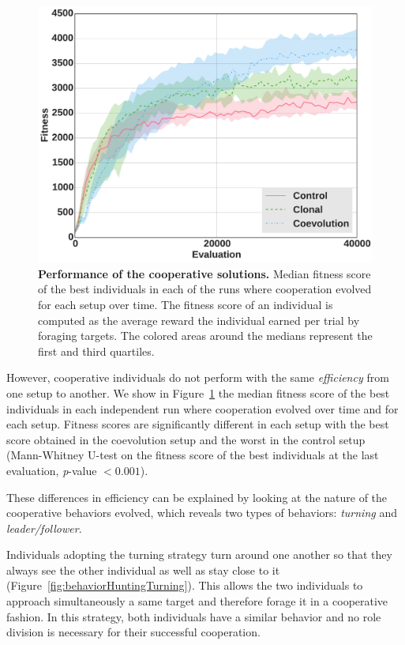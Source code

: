     \begin{figure}[h]
      \begin{center}
        \includegraphics[scale = 0.40]{fig/ArticleRob1/fitnessHuntingStags.pdf}
        \caption{\textbf{Performance of the cooperative solutions.}
        Median fitness score of the best individuals in each of the runs where cooperation evolved for each setup over time. The fitness score of an individual is computed as the average reward the individual earned per trial by foraging targets. The colored areas around the medians represent the first and third quartiles.} 
        \label{fig:HuntingFitness}
      \end{center}
    \end{figure}

    However, cooperative individuals do not perform with the same \emph{efficiency} from one setup to another. We show in Figure~\ref{fig:HuntingFitness} the median fitness score of the best individuals in each independent run where cooperation evolved over time and for each setup. Fitness scores are significantly different in each setup with the best score obtained in the coevolution setup and the worst in the control setup (Mann-Whitney U-test on the fitness score of the best individuals at the last evaluation, {\em p}-value $< 0.001$).

    These differences in efficiency can be explained by looking at the nature of the cooperative behaviors evolved, which reveals two types of behaviors: \emph{turning} and \emph{leader/follower}.

    Individuals adopting the turning strategy turn around one another so that they always see the other individual as well as stay close to it (Figure~\ref{fig:behaviorHuntingTurning}). This allows the two individuals to approach simultaneously a same target and therefore forage it in a cooperative fashion. In this strategy, both individuals have a similar behavior and no role division is necessary for their successful cooperation.

